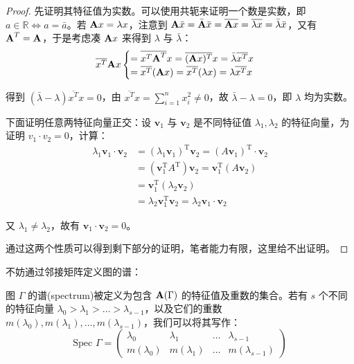 \begin{proof}
先证明其特征值为实数。可以使用共轭来证明一个数是实数，即 $a\in \mathbb R \Leftrightarrow a = \bar a$。若 $\textbf A x = \lambda x$，注意到 $\textbf A\bar x = \bar{\textbf A}\bar x = \overline{\textbf Ax} = \overline{\lambda x} = \bar\lambda\bar x$，又有 $\textbf A^{T} = \textbf A$，于是考虑凑 $\textbf Ax$ 来得到 $\lambda$ 与 $\bar \lambda$：
\[
\overline {x^T}\textbf Ax\begin{cases}
= \overline {x^T\textbf A^T}x = \overline {(\textbf Ax)^T}x = \bar\lambda \overline {x^T}x
\\
= \overline {x^T}(\textbf Ax) = \overline {x^T}(\lambda x) = \lambda \overline {x^T}x
\end{cases}
\]

得到 $(\bar \lambda-\lambda)\overline {x^T}x = 0$，由 $\overline {x^T}x = \sum_{i = 1}^n x_i^2 \neq 0$，故 $\bar \lambda-\lambda = 0$，即 $\lambda$ 均为实数。

下面证明任意两特征向量正交：设 $\boldsymbol{v}_{1}$ 与 $\boldsymbol{v}_{2}$ 是不同特征值 $\lambda_1, \lambda_2$ 的特征向量，为证明 $v_1 \cdot v_2 = 0$，计算：
\[
\begin{aligned}
\lambda_{1} \boldsymbol{v}_{1} \cdot \boldsymbol{v}_{2} &=\left(\lambda_{1} \boldsymbol{v}_{1}\right)^{\mathrm{T}} \boldsymbol{v}_{2}=\left(A \boldsymbol{v}_{1}\right)^{\mathrm{T}} \cdot \boldsymbol{v}_{2} \\
&=\left(\boldsymbol{v}_{1}^{\mathrm{T}} A^{\mathrm{T}}\right) \boldsymbol{v}_{2}=\boldsymbol{v}_{1}^{\mathrm{T}}\left(A \boldsymbol{v}_{2}\right) \\
&=\boldsymbol{v}_{1}^{\mathrm{T}}\left(\lambda_{2} \boldsymbol{v}_{2}\right) \\
&=\lambda_{2} \boldsymbol{v}_{1}^{\mathrm{T}} \boldsymbol{v}_{2}=\lambda_{2} \boldsymbol{v}_{1} \cdot \boldsymbol{v}_{2}
\end{aligned}
\]

又 $\lambda_{1} \neq \lambda_{2}$，故有 $\boldsymbol{v}_{1} \cdot \boldsymbol{v}_{2} = 0$。

通过这两个性质可以得到剩下部分的证明，笔者能力有限，这里给不出证明。
\end{proof}

不妨通过邻接矩阵定义图的谱：

\begin{definition}[谱]
图 $\Gamma$ 的谱(spectrum)被定义为包含 $\textbf A(\Gamma)$ 的特征值及重数的集合。若有 $s$ 个不同的特征向量 $\lambda_0 > \lambda_1 > \dots > \lambda_{s-1}$，以及它们的重数 $m(\lambda_0) , m(\lambda_1) , \dots , m(\lambda_{s-1})$，我们可以将其写作：
\[
\text{Spec }\Gamma = 
\begin{pmatrix}
 \lambda_0 & \lambda_1 & \dots & \lambda_{s-1} \\
 m(\lambda_0) & m(\lambda_1) & \dots & m(\lambda_{s-1})
\end{pmatrix}
\]
\end{definition}

